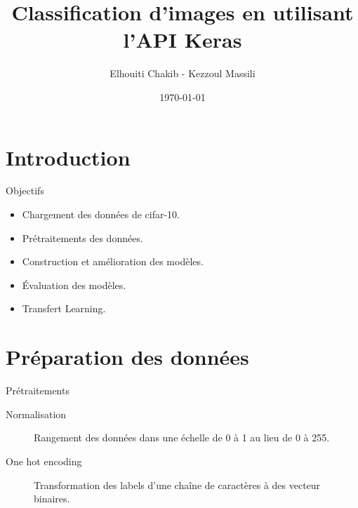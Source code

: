 \documentclass[10pt,handout]{beamer}
\title[Classification d'images]{Classification d’images en utilisant l’API
Keras}
\author[Elhouiti, Kezzoul]{Elhouiti Chakib - Kezzoul Massili }
\institute[]{Université de Montpellier}
\date{\today}
\newif\ifplacelogo %
\begin{document}
\placelogofalse
\begin{frame}
	\titlepage
\end{frame}

\placelogotrue
\section{Introduction}

\begin{frame}{Objectifs}
    \begin{itemize}
        \item Chargement des données de cifar-10.
        \item Prétraitements des données.
        \item Construction et amélioration des modèles.
        \item Évaluation des modèles.
        \item Transfert Learning.
    \end{itemize}
\end{frame}

\section{Préparation des données}
\begin{frame}
    \begin{block}{Prétraitements}
        \begin{description}
            \item[Normalisation] Rangement des données dans une échelle de 0 à 1 au lieu de 0 à 255.
            \item[One hot encoding] Transformation des labels d'une chaîne de caractères à des vecteur binaires.
        \end{description}
    \end{block}
\end{frame}
    
\end{document}
